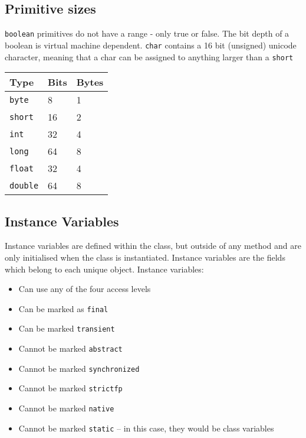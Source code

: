 \subsection{Primitive sizes}
\verb#boolean# primitives do not have a range - only true or false. The bit 
depth of a boolean is virtual machine dependent. \verb#char# contains a 16 bit 
(unsigned) unicode character, meaning that a char can be assigned to anything 
larger than a \verb#short#

\begin{center}
\begin{tabular}{lll}
    \textbf{Type} & \textbf{Bits} & \textbf{Bytes} \\
    \hline
    \verb#byte# & 8 & 1 \\
    \verb#short# & 16 & 2 \\
    \verb#int# & 32 & 4 \\
    \verb#long# & 64 & 8 \\
    \verb#float# & 32 & 4 \\
    \verb#double# & 64 & 8 \\
\end{tabular}
\end{center}

\subsection{Instance Variables}
Instance variables are defined within the class, but outside of any method and 
are only initialised when the class is instantiated. Instance variables are the 
fields which belong to each unique object. Instance variables:
\begin{itemize}
    \item Can use any of the four access levels
    \item Can be marked as \verb#final#
    \item Can be marked \verb#transient#
    \item Cannot be marked \verb#abstract#
    \item Cannot be marked \verb#synchronized#
    \item Cannot be marked \verb#strictfp#
    \item Cannot be marked \verb#native#
    \item Cannot be marked \verb#static# -- in this case, they would be class 
    variables
\end{itemize}


